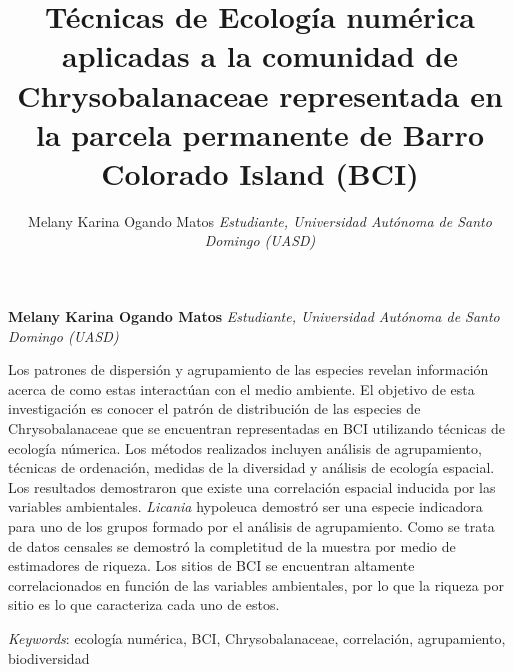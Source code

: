 \documentclass[11pt,]{article}
\title{Técnicas de Ecología numérica aplicadas a la comunidad de
Chrysobalanaceae representada en la parcela permanente de Barro Colorado
Island (BCI)  }
\author{\Large Melany Karina Ogando Matos\vspace{0.05in} \newline\normalsize\emph{Estudiante, Universidad Autónoma de Santo Domingo (UASD)}  }
\date{}
\newcommand*{\authorfont}{\fontfamily{phv}\selectfont}
\renewenvironment{abstract}
 {{%
    \setlength{\leftmargin}{0mm}
    \setlength{\rightmargin}{\leftmargin}%
  }%
  \relax}
 {\endlist}
\begin{document}
	
%

{%
\setlength{\parindent}{0pt}
\thispagestyle{plain}
{\fontsize{18}{20}\selectfont\raggedright 
\maketitle  %

}

{
   \vskip 13.5pt\relax \normalsize\fontsize{11}{12} 
\textbf{\authorfont Melany Karina Ogando Matos} \hskip 15pt \emph{\small Estudiante, Universidad Autónoma de Santo Domingo (UASD)}   

}

}








\begin{abstract}

    \hbox{\vrule height .2pt width 39.14pc}

    \vskip 8.5pt %

\noindent Los patrones de dispersión y agrupamiento de las especies revelan
información acerca de como estas interactúan con el medio ambiente. El
objetivo de esta investigación es conocer el patrón de distribución de
las especies de Chrysobalanaceae que se encuentran representadas en BCI
utilizando técnicas de ecología númerica. Los métodos realizados
incluyen análisis de agrupamiento, técnicas de ordenación, medidas de la
diversidad y análisis de ecología espacial. Los resultados demostraron
que existe una correlación espacial inducida por las variables
ambientales. \emph{Licania }hypoleuca demostró ser una especie
indicadora para uno de los grupos formado por el análisis de
agrupamiento. Como se trata de datos censales se demostró la completitud
de la muestra por medio de estimadores de riqueza. Los sitios de BCI se
encuentran altamente correlacionados en función de las variables
ambientales, por lo que la riqueza por sitio es lo que caracteriza cada
uno de estos.


\vskip 8.5pt \noindent \emph{Keywords}: ecología numérica, BCI, Chrysobalanaceae, correlación, agrupamiento,
biodiversidad \par

    \hbox{\vrule height .2pt width 39.14pc}



\end{abstract}
\end{document}
